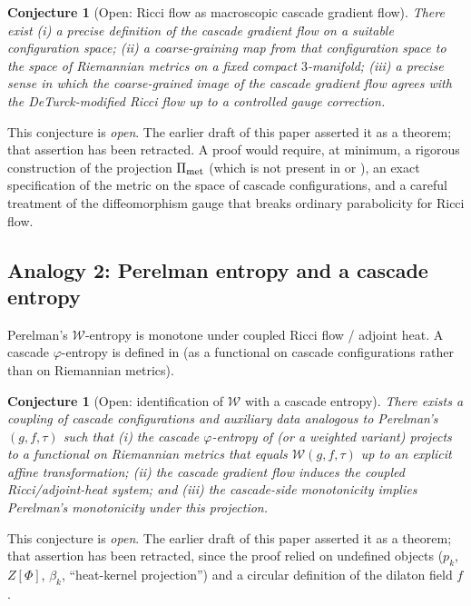 \documentclass[11pt, a4paper]{amsart}
\newtheorem{conjecture}[theorem]{Conjecture}
\theoremstyle{definition}
\begin{document}
\begin{conjecture}[Open: Ricci flow as macroscopic cascade gradient
flow]
\label{conj:ricci-cascade}
There exist (i) a precise definition of the cascade gradient flow
on a suitable configuration space; (ii) a coarse-graining map from
that configuration space to the space of Riemannian metrics on a
fixed compact $3$-manifold; (iii) a precise sense in which the
coarse-grained image of the cascade gradient flow agrees with the
DeTurck-modified Ricci flow up to a controlled gauge correction.
\end{conjecture}

\noindent
This conjecture is \emph{open}. The earlier draft of this paper
asserted it as a theorem; that assertion has been retracted. A
proof would require, at minimum, a rigorous construction of the
projection $\Pi_{\rm met}$ (which is not present in
\cite{CascadePregeometry} or \cite{CascadeGR}), an exact
specification of the metric on the space of cascade configurations,
and a careful treatment of the diffeomorphism gauge that breaks
ordinary parabolicity for Ricci flow.

\subsection{Analogy 2: Perelman entropy and a cascade entropy}

Perelman's $\mathcal{W}$-entropy \cite[\S 3]{Perelman1} is monotone
under coupled Ricci flow / adjoint heat. A cascade
$\varphi$-entropy is defined in \cite[P2]{CascadePregeometry} (as a
functional on cascade configurations rather than on Riemannian
metrics).

\begin{conjecture}[Open: identification of $\mathcal{W}$ with a
cascade entropy]
\label{conj:W-cascade}
There exists a coupling of cascade configurations and auxiliary
data analogous to Perelman's $(g, f, \tau)$ such that (i) the
cascade $\varphi$-entropy of \cite[P2]{CascadePregeometry} (or a
weighted variant) projects to a functional on Riemannian metrics
that equals $\mathcal{W}(g, f, \tau)$ up to an explicit affine
transformation; (ii) the cascade gradient flow induces the coupled
Ricci/adjoint-heat system; and (iii) the cascade-side monotonicity
implies Perelman's monotonicity under this projection.
\end{conjecture}

\noindent
This conjecture is \emph{open}. The earlier draft of this paper
asserted it as a theorem; that assertion has been retracted, since
the proof relied on undefined objects ($p_{k}$, $Z[\Phi]$,
$\beta_{k}$, ``heat-kernel projection'') and a circular definition
of the dilaton field $f$.
\end{document}
